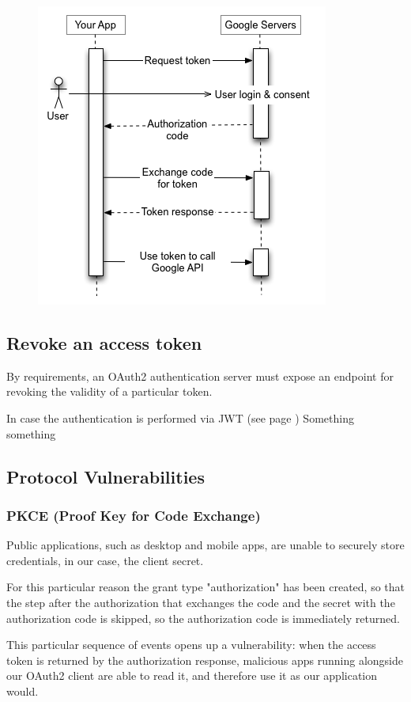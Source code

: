 \documentclass[20pt]{style}
\begin{document}
\begin{figure}[h]
    \centering
    \includegraphics[width=.5\textwidth]{authorization-code.png}
\end{figure}

\subsection{Revoke an access token}
By requirements, an OAuth2 authentication server must expose an endpoint for
revoking the validity of a particular token.

In case the authentication is performed via JWT (see page \pageref{jwt})
Something something

\subsection{Protocol Vulnerabilities}
\subsubsection{PKCE (Proof Key for Code Exchange)}
Public applications, such as desktop and mobile apps, are unable to securely
store credentials, in our case, the client secret.

For this particular reason the grant type "authorization" has been created, so
that the step after the authorization that exchanges the code and the secret
with the authorization code is skipped, so the authorization code is immediately
returned.

This particular sequence of events opens up a vulnerability:
when the access token is returned by the authorization response, malicious apps
running alongside our OAuth2 client are able to read it, and therefore use it as
our application would.
\end{document}
